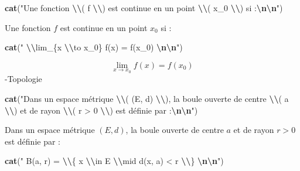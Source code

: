 \documentclass[
]{article}
\newenvironment{Shaded}{\begin{snugshade}}{\end{snugshade}}
\newcommand{\FunctionTok}[1]{\textcolor[rgb]{0.13,0.29,0.53}{\textbf{#1}}}
\newcommand{\NormalTok}[1]{#1}
\newcommand{\SpecialCharTok}[1]{\textcolor[rgb]{0.81,0.36,0.00}{\textbf{#1}}}
\newcommand{\StringTok}[1]{\textcolor[rgb]{0.31,0.60,0.02}{#1}}
\begin{document}
\begin{Shaded}
\begin{Highlighting}[]
\FunctionTok{cat}\NormalTok{(}\StringTok{"Une fonction }\SpecialCharTok{\textbackslash{}\textbackslash{}}\StringTok{( f }\SpecialCharTok{\textbackslash{}\textbackslash{}}\StringTok{) est continue en un point }\SpecialCharTok{\textbackslash{}\textbackslash{}}\StringTok{( x\_0 }\SpecialCharTok{\textbackslash{}\textbackslash{}}\StringTok{) si :}\SpecialCharTok{\textbackslash{}n\textbackslash{}n}\StringTok{"}\NormalTok{)}
\end{Highlighting}
\end{Shaded}

Une fonction \(f\) est continue en un point \(x_0\) si :

\begin{Shaded}
\begin{Highlighting}[]
\FunctionTok{cat}\NormalTok{(}\StringTok{"$$ }\SpecialCharTok{\textbackslash{}\textbackslash{}}\StringTok{lim\_\{x }\SpecialCharTok{\textbackslash{}\textbackslash{}}\StringTok{to x\_0\} f(x) = f(x\_0) $$}\SpecialCharTok{\textbackslash{}n\textbackslash{}n}\StringTok{"}\NormalTok{)}
\end{Highlighting}
\end{Shaded}

\[ \lim_{x \to x_0} f(x) = f(x_0) \] -Topologie

\begin{Shaded}
\begin{Highlighting}[]
\FunctionTok{cat}\NormalTok{(}\StringTok{"Dans un espace métrique }\SpecialCharTok{\textbackslash{}\textbackslash{}}\StringTok{( (E, d) }\SpecialCharTok{\textbackslash{}\textbackslash{}}\StringTok{), la boule ouverte de centre }\SpecialCharTok{\textbackslash{}\textbackslash{}}\StringTok{( a }\SpecialCharTok{\textbackslash{}\textbackslash{}}\StringTok{) et de rayon }\SpecialCharTok{\textbackslash{}\textbackslash{}}\StringTok{( r \textgreater{} 0 }\SpecialCharTok{\textbackslash{}\textbackslash{}}\StringTok{) est définie par :}\SpecialCharTok{\textbackslash{}n\textbackslash{}n}\StringTok{"}\NormalTok{)}
\end{Highlighting}
\end{Shaded}

Dans un espace métrique \((E, d)\), la boule ouverte de centre \(a\) et
de rayon \(r > 0\) est définie par :

\begin{Shaded}
\begin{Highlighting}[]
\FunctionTok{cat}\NormalTok{(}\StringTok{"$$ B(a, r) = }\SpecialCharTok{\textbackslash{}\textbackslash{}}\StringTok{\{ x }\SpecialCharTok{\textbackslash{}\textbackslash{}}\StringTok{in E }\SpecialCharTok{\textbackslash{}\textbackslash{}}\StringTok{mid d(x, a) \textless{} r }\SpecialCharTok{\textbackslash{}\textbackslash{}}\StringTok{\} $$}\SpecialCharTok{\textbackslash{}n\textbackslash{}n}\StringTok{"}\NormalTok{)}
\end{Highlighting}
\end{Shaded}
\end{document}
